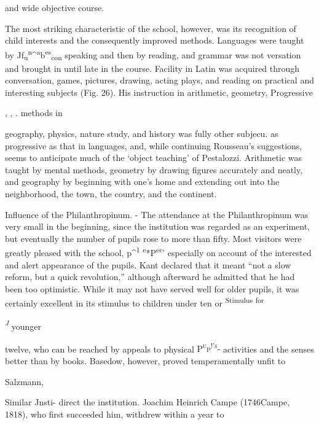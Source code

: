 \documentclass[
]{book}
\begin{document}
and wide objective course.

The most striking characteristic of the school, however, was its recognition of child interests and the consequently improved methods. Languages were taught by Jf\textsubscript{u}\textsuperscript{n}\^{}\textsuperscript{a}b\textsuperscript{es}\textsubscript{con} speaking and then by reading, and grammar was not versation and brought in until late in the course. Facility in Latin was acquired through conversation, games, pictures, drawing, acting plays, and reading on practical and interesting subjects (Fig. 26). His instruction in arithmetic, geometry, Progressive

, , . methods in

geography, physics, nature study, and history was fully other subjecu. as progressive as that in languages, and, while continuing Rousseau's suggestions, seems to anticipate much of the `object teaching' of Pestalozzi. Arithmetic was taught by mental methods, geometry by drawing figures accurately and neatly, and geography by beginning with one's home and extending out into the neighborhood, the town, the country, and the continent.

Influence of the Philanthropinum. - The attendance at the Philanthropinum was very small in the beginning, since the institution was regarded as an experiment, but eventually the number of pupils rose to more than fifty. Most visitors were greatly pleased with the school, p\^{}\textsuperscript{1} \textsuperscript{e}*P\textsuperscript{ec}' especially on account of the interested and alert appearance of the pupils. Kant declared that it meant ``not a slow reform, but a quick revolution,'' although afterward he admitted that he had been too optimistic. While it may not have served well for older pupils, it was certainly excellent in its stimulus to children under ten or \textsuperscript{Stimulus} \textsuperscript{for}

\emph{\textsuperscript{J}} younger

twelve, who can be reached by appeals to physical \textsc{P\textsuperscript{u}p\textsuperscript{!'s}- }activities and the senses better than by books. Basedow, however, proved temperamentally unfit to

Salzmann,

Similar Jnsti- direct the institution. Joachim Heinrich Campe (1746Campe, 1818), who first succeeded him, withdrew within a year to
\end{document}
